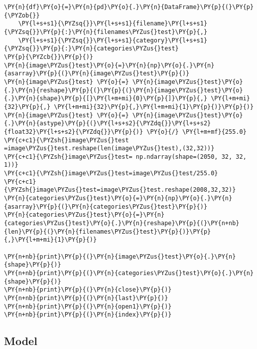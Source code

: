 \begin{tcolorbox}[breakable, size=fbox, boxrule=1pt, pad at break*=1mm,colback=cellbackground, colframe=cellborder]
\begin{Verbatim}[commandchars=\\\{\}]
\PY{n}{df}\PY{o}{=}\PY{n}{pd}\PY{o}{.}\PY{n}{DataFrame}\PY{p}{(}\PY{p}{\PYZob{}}
    \PY{l+s+s1}{\PYZsq{}}\PY{l+s+s1}{filename}\PY{l+s+s1}{\PYZsq{}}\PY{p}{:}\PY{n}{filenames\PYZus{}test}\PY{p}{,}
    \PY{l+s+s1}{\PYZsq{}}\PY{l+s+s1}{category}\PY{l+s+s1}{\PYZsq{}}\PY{p}{:}\PY{n}{categories\PYZus{}test}
\PY{p}{\PYZcb{}}\PY{p}{)}
\PY{n}{image\PYZus{}test}\PY{o}{=}\PY{n}{np}\PY{o}{.}\PY{n}{asarray}\PY{p}{(}\PY{n}{image\PYZus{}test}\PY{p}{)}
\PY{n}{image\PYZus{}test} \PY{o}{=} \PY{n}{image\PYZus{}test}\PY{o}{.}\PY{n}{reshape}\PY{p}{(}\PY{p}{(}\PY{n}{image\PYZus{}test}\PY{o}{.}\PY{n}{shape}\PY{p}{[}\PY{l+m+mi}{0}\PY{p}{]}\PY{p}{,} \PY{l+m+mi}{32}\PY{p}{,} \PY{l+m+mi}{32}\PY{p}{,}\PY{l+m+mi}{1}\PY{p}{)}\PY{p}{)}
\PY{n}{image\PYZus{}test} \PY{o}{=} \PY{n}{image\PYZus{}test}\PY{o}{.}\PY{n}{astype}\PY{p}{(}\PY{l+s+s2}{\PYZdq{}}\PY{l+s+s2}{float32}\PY{l+s+s2}{\PYZdq{}}\PY{p}{)} \PY{o}{/} \PY{l+m+mf}{255.0}
\PY{c+c1}{\PYZsh{}image\PYZus{}test =image\PYZus{}test.reshape(len(image\PYZus{}test),(32,32))}
\PY{c+c1}{\PYZsh{}image\PYZus{}test= np.ndarray(shape=(2050, 32, 32, 1))}
\PY{c+c1}{\PYZsh{}image\PYZus{}test=image\PYZus{}test/255.0}
\PY{c+c1}{\PYZsh{}image\PYZus{}test=image\PYZus{}test.reshape(2008,32,32)}
\PY{n}{categories\PYZus{}test}\PY{o}{=}\PY{n}{np}\PY{o}{.}\PY{n}{asarray}\PY{p}{(}\PY{n}{categories\PYZus{}test}\PY{p}{)}
\PY{n}{categories\PYZus{}test}\PY{o}{=}\PY{n}{categories\PYZus{}test}\PY{o}{.}\PY{n}{reshape}\PY{p}{(}\PY{n+nb}{len}\PY{p}{(}\PY{n}{filenames\PYZus{}test}\PY{p}{)}\PY{p}{,}\PY{l+m+mi}{1}\PY{p}{)}

\PY{n+nb}{print}\PY{p}{(}\PY{n}{image\PYZus{}test}\PY{o}{.}\PY{n}{shape}\PY{p}{)}
\PY{n+nb}{print}\PY{p}{(}\PY{n}{categories\PYZus{}test}\PY{o}{.}\PY{n}{shape}\PY{p}{)}
\PY{n+nb}{print}\PY{p}{(}\PY{n}{close}\PY{p}{)}
\PY{n+nb}{print}\PY{p}{(}\PY{n}{last}\PY{p}{)}
\PY{n+nb}{print}\PY{p}{(}\PY{n}{open1}\PY{p}{)}
\PY{n+nb}{print}\PY{p}{(}\PY{n}{index}\PY{p}{)}
\end{Verbatim}
\end{tcolorbox}

\subsection{    Model}

